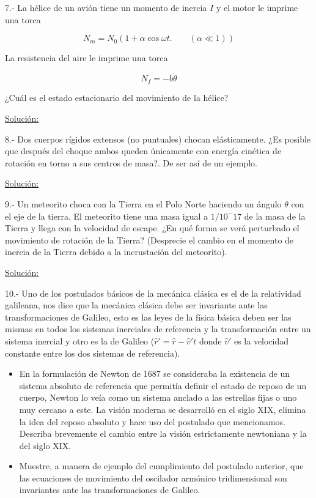 \documentclass[a4paper,10pt]{article}
\begin{document}
\vspace{.3cm}

7.- La hélice de un avión tiene un momento de inercia $I$ y el motor le imprime una torca 

$$N_m = N_0 (1+\alpha \cos{\omega t}. \qquad (\alpha \ll 1))$$

La resistencia del aire le imprime una torca

$$N_f = -b\dot{\theta}$$

¿Cuál es el estado estacionario del movimiento de la hélice?

\vspace{.3cm}

\underline{Solución:}

\vspace{.3cm}

8.- Dos cuerpos rígidos extensos (no puntuales) chocan elásticamente. ¿Es posible que 
después del choque ambos queden únicamente con energía cinética de rotación en torno 
a sus centros de masa?. De ser así de un ejemplo.
\vspace{.3cm}

\underline{Solución:}

\vspace{.3cm}
9.- Un meteorito choca con la Tierra en el Polo Norte haciendo un ángulo $\theta$ con
el eje de la tierra. El meteorito tiene una masa igual a $1/10^-17$ de la masa de la 
Tierra y llega con la velocidad de escape. ¿En qué forma se verá perturbado el movimiento
de rotación de la Tierra? (Desprecie el cambio en el momento de inercia de la Tierra
debido a la incrustación del meteorito).
\vspace{.3cm}

\underline{Solución:}

\vspace{.3cm}

10.- Uno de los postulados básicos de la mecánica clásica es el de la relatividad galileana,
nos dice que la mecánica clásica debe ser invariante ante las transformaciones de Galileo, 
esto es las leyes de la física básica deben ser las mismas en todos los sistemas inerciales
de referencia y la transformación entre un sistema inercial y otro es la de Galileo 
($\hat{r}' = \hat{r} - \hat{v}'t$ donde $\hat{v}'$ es la velocidad constante entre los dos 
sistemas de referencia).

\begin{itemize}
 \item En la formulación de Newton de 1687 se consideraba la existencia de un sistema 
 absoluto de referencia que permitía definir el estado de reposo de un cuerpo, Newton lo
 veía como un sistema anclado a las estrellas fijas o uno muy cercano a este. La visión 
 moderna se desarrolló en el siglo XIX, elimina la idea del reposo absoluto y hace 
 uso del postulado que mencionamos. Describa brevemente el cambio entre la visión 
 estrictamente newtoniana y la del siglo XIX.
 \item Muestre, a manera de ejemplo del cumplimiento del postulado anterior, que las 
 ecuaciones de movimiento del oscilador armónico tridimensional son invariantes ante
 las transformaciones de Galileo.
\end{itemize}
\end{document}
